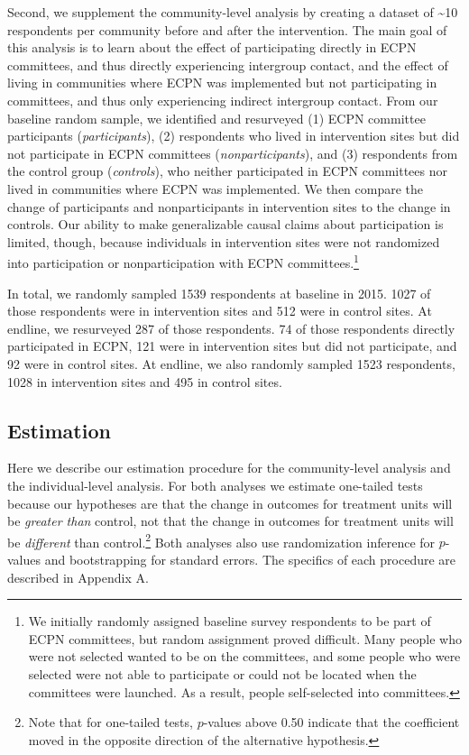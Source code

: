\documentclass[11pt]{article}
\begin{document}
Second, we supplement the community-level analysis by creating a dataset
of \textasciitilde10 respondents per community before and after the
intervention. The main goal of this analysis is to learn about the
effect of participating directly in ECPN committees, and thus directly
experiencing intergroup contact, and the effect of living in communities
where ECPN was implemented but not participating in committees, and thus
only experiencing indirect intergroup contact. From our baseline random
sample, we identified and resurveyed (1) ECPN committee participants
(\emph{participants}), (2) respondents who lived in intervention sites
but did not participate in ECPN committees (\emph{nonparticipants}), and
(3) respondents from the control group (\emph{controls}), who neither
participated in ECPN committees nor lived in communities where ECPN was
implemented. We then compare the change of participants and
nonparticipants in intervention sites to the change in controls. Our
ability to make generalizable causal claims about participation is
limited, though, because individuals in intervention sites were not
randomized into participation or nonparticipation with ECPN
committees.\footnote{We initially randomly assigned baseline survey
  respondents to be part of ECPN committees, but random assignment
  proved difficult. Many people who were not selected wanted to be on
  the committees, and some people who were selected were not able to
  participate or could not be located when the committees were launched.
  As a result, people self-selected into committees.}

In total, we randomly sampled 1539 respondents at baseline in 2015. 1027
of those respondents were in intervention sites and 512 were in control
sites. At endline, we resurveyed 287 of those respondents. 74 of those
respondents directly participated in ECPN, 121 were in intervention
sites but did not participate, and 92 were in control sites. At endline,
we also randomly sampled 1523 respondents, 1028 in intervention sites
and 495 in control sites.

\hypertarget{estimation}{%
\subsection{Estimation}\label{estimation}}

Here we describe our estimation procedure for the community-level
analysis and the individual-level analysis. For both analyses we
estimate one-tailed tests because our hypotheses are that the change in
outcomes for treatment units will be \emph{greater than} control, not
that the change in outcomes for treatment units will be \emph{different}
than control.\footnote{Note that for one-tailed tests, \(p\)-values
  above 0.50 indicate that the coefficient moved in the opposite
  direction of the alternative hypothesis.} Both analyses also use
randomization inference for \(p\)-values and bootstrapping for standard
errors. The specifics of each procedure are described in Appendix A.
\end{document}
